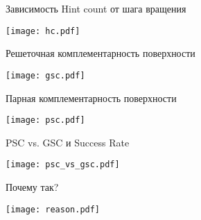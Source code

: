   \begin{frame}{Зависимость Hint count от шага вращения}
            \begin{center}
          \texttt{[image: hc.pdf]}

            \end{center}
  \end{frame}

  \begin{frame}{Решеточная комплементарность поверхности}
            \begin{center}
          \texttt{[image: gsc.pdf]}

            \end{center}
  \end{frame}


  \begin{frame}{Парная комплементарность поверхности}
            \begin{center}
          \texttt{[image: psc.pdf]}

            \end{center}
  \end{frame}



  \begin{frame}{ PSC vs. GSC и  Success Rate}
      \begin{center}
          \texttt{[image: psc\_vs\_gsc.pdf]}

            \end{center}
  \end{frame}


  \begin{frame}{Почему так? }
      \begin{center}
          \texttt{[image: reason.pdf]}

            \end{center}
  \end{frame}

